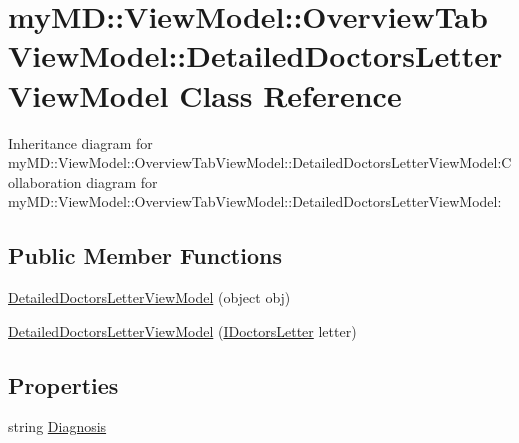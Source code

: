 \hypertarget{classmy_m_d_1_1_view_model_1_1_overview_tab_view_model_1_1_detailed_doctors_letter_view_model}{
\section{my\-MD::View\-Model::Overview\-Tab\-View\-Model::Detailed\-Doctors\-Letter\-View\-Model Class Reference}
\label{dc/d42/classmy_m_d_1_1_view_model_1_1_overview_tab_view_model_1_1_detailed_doctors_letter_view_model}
}
Inheritance diagram for my\-MD::View\-Model::Overview\-Tab\-View\-Model::Detailed\-Doctors\-Letter\-View\-Model:Collaboration diagram for my\-MD::View\-Model::Overview\-Tab\-View\-Model::Detailed\-Doctors\-Letter\-View\-Model:\subsection*{Public Member Functions}
\begin{CompactItemize}
\item 
\hypertarget{classmy_m_d_1_1_view_model_1_1_overview_tab_view_model_1_1_detailed_doctors_letter_view_model_647dcac8211fbd99074ae2ca3fd471db}{
\hyperlink{classmy_m_d_1_1_view_model_1_1_overview_tab_view_model_1_1_detailed_doctors_letter_view_model_647dcac8211fbd99074ae2ca3fd471db}{Detailed\-Doctors\-Letter\-View\-Model} (object obj)}
\label{dc/d42/classmy_m_d_1_1_view_model_1_1_overview_tab_view_model_1_1_detailed_doctors_letter_view_model_647dcac8211fbd99074ae2ca3fd471db}

\item 
\hypertarget{classmy_m_d_1_1_view_model_1_1_overview_tab_view_model_1_1_detailed_doctors_letter_view_model_f17f1ac03f0fe5390a5abb4ea7b391be}{
\hyperlink{classmy_m_d_1_1_view_model_1_1_overview_tab_view_model_1_1_detailed_doctors_letter_view_model_f17f1ac03f0fe5390a5abb4ea7b391be}{Detailed\-Doctors\-Letter\-View\-Model} (\hyperlink{interfacemy_m_d_1_1_model_interface_1_1_data_model_interface_1_1_i_doctors_letter}{IDoctors\-Letter} letter)}
\label{dc/d42/classmy_m_d_1_1_view_model_1_1_overview_tab_view_model_1_1_detailed_doctors_letter_view_model_f17f1ac03f0fe5390a5abb4ea7b391be}

\end{CompactItemize}
\subsection*{Properties}
\begin{CompactItemize}
\item 
\hypertarget{classmy_m_d_1_1_view_model_1_1_overview_tab_view_model_1_1_detailed_doctors_letter_view_model_523223d6c6fe8798f0d70f376ffc99b8}{
string \hyperlink{classmy_m_d_1_1_view_model_1_1_overview_tab_view_model_1_1_detailed_doctors_letter_view_model_523223d6c6fe8798f0d70f376ffc99b8}{Diagnosis}}
\label{dc/d42/classmy_m_d_1_1_view_model_1_1_overview_tab_view_model_1_1_detailed_doctors_letter_view_model_523223d6c6fe8798f0d70f376ffc99b8}

\end{CompactItemize}


